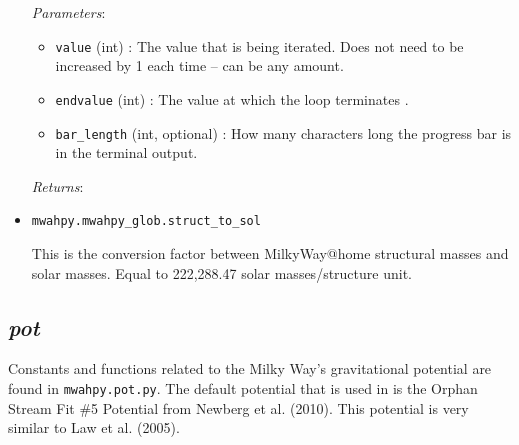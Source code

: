 \documentclass{article}
\begin{document}
\begin{itemize}
\textit{Parameters}: \begin{itemize}

\item \verb!value! (int) : The value that is being iterated. Does not need to be increased by 1 each time -- can be any amount. 

\item \verb!endvalue! (int) : The value at which the loop terminates .

\item \verb!bar_length! (int, optional) : How many characters long the progress bar is in the terminal output.

\end{itemize}

\textit{Returns}:



\item \verb!mwahpy.mwahpy_glob.struct_to_sol!

This is the conversion factor between MilkyWay@home structural masses and solar masses. Equal to 222,288.47 solar masses/structure unit.

\end{itemize} 

\subsection{\textit{pot}}

Constants and functions related to the Milky Way's gravitational potential are found in \verb!mwahpy.pot.py!. The default potential that is used in \mwahpy is the Orphan Stream Fit \#5 Potential from Newberg et al. (2010). This potential is very similar to Law et al. (2005). 
\end{document}
